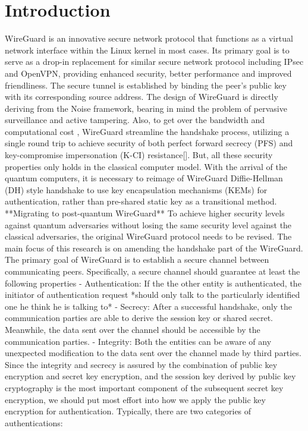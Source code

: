 \chapter{Introduction}

WireGuard is an innovative secure network protocol that functions as a virtual network interface within the Linux kernel in most cases. Its primary goal is to serve as a drop-in replacement for similar secure network protocol including IPsec and OpenVPN, providing enhanced security, better performance and improved friendliness. The secure tunnel is established by binding the peer's public key with its corresponding source address. The design of WireGuard is directly deriving from the Noise framework, bearing in mind the problem of pervasive surveillance and active tampering. Also, to get over the bandwidth and computational cost , WireGuard streamline the handshake process, utilizing a single round trip to achieve security of both perfect forward secrecy (PFS) and key-compromise impersonation (K-CI) resistance[].
But, all these security properties only holds in the classical computer model. With the arrival of the quantum computers, it is necessary to reimage of WireGuard Diffie-Hellman (DH) style handshake to use key encapsulation mechanisms (KEMs) for authentication, rather than pre-shared static key as a transitional method. 
**Migrating to post-quantum WireGuard** To achieve higher security levels against quantum adversaries without losing the same security level against the classical adversaries, the original WireGuard protocol needs to be revised. The main focus of this research is on amending the handshake part of the WireGuard.
The primary goal of WireGuard is to establish a secure channel between communicating peers. Specifically, a secure channel should guarantee at least the following properties
- Authentication: If the the other entity is authenticated, the initiator of authentication request *should only talk to the particularly identified one he think he is talking to*
- Secrecy: After a successful handshake, only the communication parties are able to derive the session key or shared secret. Meanwhile, the data sent over the channel should be accessible by the communication parties. 
- Integrity: Both the entities can be aware of any unexpected modification to the data sent over the channel made by third parties.
Since the integrity and secrecy is assured by the combination of public key encryption and secret key encryption, and the session key derived by public key cryptography is the most important component of the subsequent secret key encryption, we should put most effort into how we apply the public key encryption for authentication. Typically, there are two categories of authentications: 
